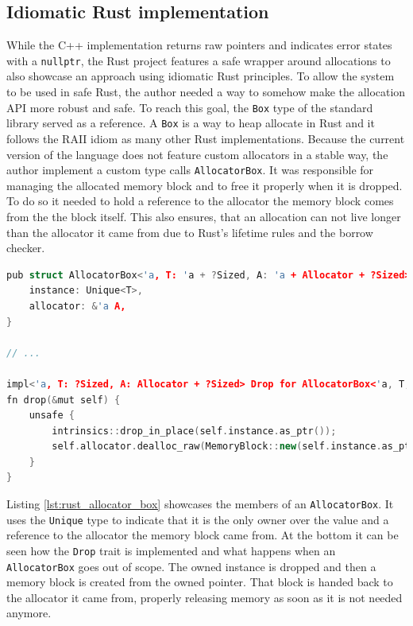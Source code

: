 \subsection{Idiomatic Rust implementation}

While the C++ implementation returns raw pointers and indicates error states with a \texttt{nullptr}, the Rust project features a safe wrapper around allocations to also showcase an approach using idiomatic Rust principles. To allow the system to be used in safe Rust, the author needed a way to somehow make the allocation \ac{API} more robust and safe. To reach this goal, the \texttt{Box} type of the standard library served as a reference. A \texttt{Box} is a way to heap allocate in Rust and it follows the \ac{RAII} idiom as many other Rust implementations. Because the current version of the language does not feature custom allocators in a stable way, the author implement a custom type calls \texttt{AllocatorBox}. It was responsible for managing the allocated memory block and to free it properly when it is dropped. To do so it needed to hold a reference to the allocator the memory block comes from the the block itself. This also ensures, that an allocation can not live longer than the allocator it came from due to Rust's lifetime rules and the borrow checker.\\

\begin{lstlisting}[caption={AllocatorBox abstraction to allow \ac{RAII} management of allocations.}, label={lst:rust_allocator_box}, language={C++}]
pub struct AllocatorBox<'a, T: 'a + ?Sized, A: 'a + Allocator + ?Sized> {
	instance: Unique<T>,
	allocator: &'a A,
}

// ...

impl<'a, T: ?Sized, A: Allocator + ?Sized> Drop for AllocatorBox<'a, T, A> {
fn drop(&mut self) {
	unsafe {
		intrinsics::drop_in_place(self.instance.as_ptr());
		self.allocator.dealloc_raw(MemoryBlock::new(self.instance.as_ptr() as *mut u8));
	}
}

\end{lstlisting}

\noindent
Listing \ref{lst:rust_allocator_box} showcases the members of an \texttt{AllocatorBox}. It uses the \texttt{Unique} type to indicate that it is the only owner over the value and a reference to the allocator the memory block came from. At the bottom it can be seen how the \texttt{Drop} trait is implemented and what happens when an \texttt{AllocatorBox} goes out of scope. The owned instance is dropped and then a memory block is created from the owned pointer. That block is handed back to the allocator it came from, properly releasing memory as soon as it is not needed anymore. 

